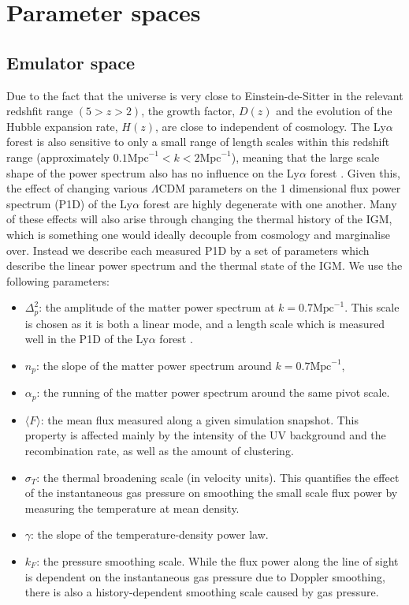 \documentclass[]{article}
\newcommand{\lyaf}{Ly$\alpha$ forest }                     %
\begin{document}
\section{Parameter spaces}
\subsection{Emulator space}
Due to the fact that the universe is very close to Einstein-de-Sitter in the relevant 
redshfit range $(5>z>2)$, the growth factor, $D(z)$ and the evolution of the Hubble 
expansion rate, $H(z)$, are close to independent of cosmology. The \lyaf is also 
sensitive to only a small range of length scales within this redshift range 
(approximately $0.1 \mathrm{Mpc}^{-1} < k < 2 \mathrm{Mpc}^{-1}$), meaning that the large 
scale shape of the power spectrum also has no influence on the \lyaf. Given this, the 
effect of changing various $\Lambda$CDM parameters on the 1 dimensional flux power 
spectrum (P1D) of the \lyaf are highly degenerate with one another. Many of these effects 
will also arise through changing the thermal history of the IGM, which is something one 
would ideally decouple from cosmology and marginalise over. Instead we describe each 
measured P1D by a set of parameters which describe the linear power spectrum and the 
thermal state of the IGM. We use the following parameters:

\begin{itemize}
    \item $\Delta^2_p$: the amplitude of the matter power spectrum at $k=0.7 \mathrm{Mpc}^
    {-1}$. This scale is chosen as it is both a linear mode, and a length scale which is 
    measured well in the P1D of the \lyaf.
    \item $n_p$: the slope of the matter power spectrum around $k=0.7 \mathrm{Mpc}^{-1}$,
    \item $\alpha_p$: the running of the matter power spectrum around the same pivot 
    scale.
    \item $\langle F\rangle$: the mean flux measured along a given simulation snapshot. 
    This property is affected mainly by the intensity of the UV background and the 
    recombination rate, as well as the amount of clustering.
    \item $\sigma_T$: the thermal broadening scale (in velocity units). This quantifies 
    the effect of the instantaneous gas pressure on smoothing the small scale flux power 
    by measuring the temperature at mean density.
    \item $\gamma$: the slope of the temperature-density power law.
    \item $k_F$: the pressure smoothing scale. While the flux power along the line of 
    sight is dependent on the instantaneous gas pressure due to Doppler smoothing, there 
    is also a history-dependent smoothing scale caused by gas pressure\cite{Hui1997}\cite{Gnedin1998}.
\end{itemize}
\end{document}
